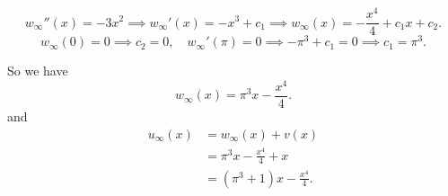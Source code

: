 \documentclass[plain]{pset}
\begin{document}
\begin{solution}
    \[w_\infty''(x) = -3x^2 \implies w_\infty'(x) = -x^3 + c_1 \implies w_\infty(x) = -\frac{x^4}{4} + c_1x + c_2.\]
    \[w_\infty(0) = 0 \implies c_2 = 0, \quad w_\infty'(\pi) = 0 \implies -\pi^3 + c_1 = 0 \implies c_1 = \pi^3.\]

    So we have
    \[w_\infty(x) = \pi^3x - \frac{x^4}{4}.\]
    and
    \begin{align*}
        u_\infty(x) & = w_\infty(x) + v(x)                       \\
                    & = \pi^3x - \frac{x^4}{4} + x               \\
                    & = \left(\pi^3 + 1\right)x - \frac{x^4}{4}.
    \end{align*}
\end{solution}

\pagebreak
\end{document}
